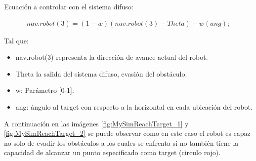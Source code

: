 

Ecuación a controlar con el sistema difuso:

\begin{equation}\boxed{
\begin{array}{rcl}
nav.robot(3)=(1-w)(nav.robot(3)-Theta) + w(ang);
\end{array}}
\end{equation}

Tal que:

\begin{itemize}
    \item nav.robot(3) representa la dirección de avance actual del robot.
    \item Theta la salida del sistema difuso, evasión del obstáculo.
    \item w: Parámetro [0-1].
    \item ang: ángulo al target con respecto a la horizontal en cada ubicación del robot.
\end{itemize}

A continuación en las imágenes \ref{fig:MySimReachTarget_1} y \ref{fig:MySimReachTarget_2} se puede observar como en este caso el robot es capaz no solo de evadir los obstáculos a los cuales se enfrenta si no también tiene la capacidad de alcanzar un punto especificado como target (circulo rojo).

\begin{figure}[ht]
\centering
{}
\end{figure}

